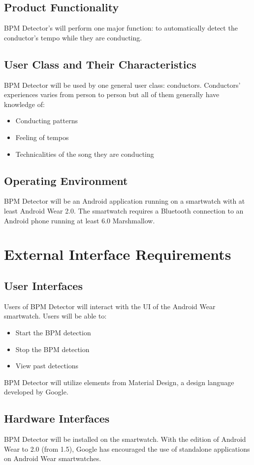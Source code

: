 \documentclass[12pt]{article}
\begin{document}
\subsection{Product Functionality}
BPM Detector's will perform one major function: to automatically detect the conductor's tempo while they are conducting.

\subsection{User Class and Their Characteristics}
BPM Detector will be used by one general user class: conductors. Conductors' experiences varies from person to person but all of them generally have knowledge of:
\begin{itemize}
	\item Conducting patterns
    \item Feeling of tempos
    \item Technicalities of the song they are conducting
 \end{itemize}

\subsection{Operating Environment}
BPM Detector will be an Android application running on a smartwatch with at least Android Wear 2.0. The smartwatch requires a Bluetooth connection to an Android phone running at least 6.0 Marshmallow.

\section{External Interface Requirements}
\subsection{User Interfaces}
Users of BPM Detector will interact with the UI of the Android Wear smartwatch. Users will be able to:
\begin{itemize}
	\item Start the BPM detection
    \item Stop the BPM detection
    \item View past detections
\end{itemize}
BPM Detector will utilize elements from Material Design, a design language developed by Google. 

\subsection{Hardware Interfaces}
BPM Detector will be installed on the smartwatch. With the edition of Android Wear to 2.0 (from 1.5), Google has encouraged the use of standalone applications on Android Wear smartwatches.
\end{document}
